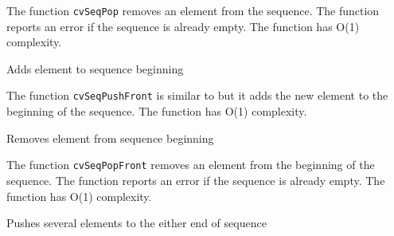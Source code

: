 The function \texttt{cvSeqPop} removes an element from the sequence. The function reports an error if the sequence is already empty. The function has O(1) complexity.

\label{SeqPushFront}

Adds element to sequence beginning


\begin{description}
\end{description}

The function \texttt{cvSeqPushFront} is similar to  but it adds the new element to the beginning of the sequence. The function has O(1) complexity.

\label{SeqPopFront}

Removes element from sequence beginning


\begin{description}
\end{description}

The function \texttt{cvSeqPopFront} removes an element from the beginning of the sequence. The function reports an error if the sequence is already empty. The function has O(1) complexity.

\label{SeqPushMulti}

Pushes several elements to the either end of sequence


